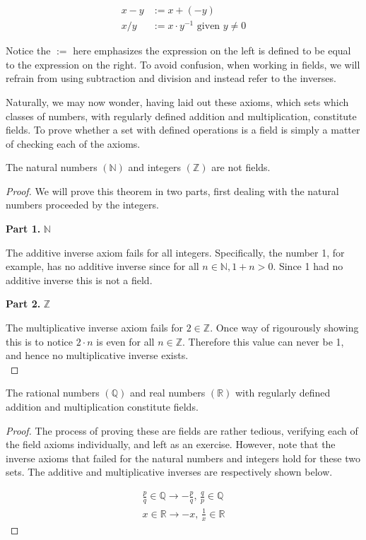 \documentclass[twoside]{report}
\newcommand{\header}[2]{\begin{flushright} \textbf{#1} #2 \end{flushright}}
\begin{document}
\begin{align}
	x - y &:= x + (-y) \\
	x / y &:= x \cdot y^{-1} \text{ given } y \neq 0
\end{align}

Notice the $:=$ here emphasizes the expression on the left is defined to be equal to the expression on the right. To avoid confusion, when working in fields, we will refrain from using subtraction and division and instead refer to the inverses.

Naturally, we may now wonder, having laid out these axioms, which sets which classes of numbers, with regularly defined addition and multiplication, constitute fields. To prove whether a set with defined operations is a field is simply a matter of checking each of the axioms. \\

\vspace{\baselineskip}
\begin{theorem}
	The natural numbers $(\mathbb{N})$ and integers $(\mathbb{Z})$ are not fields. 
\end{theorem}

\begin{proof} 
	We will prove this theorem in two parts, first dealing with the natural numbers proceeded by the integers.
	\header{Part 1. }{$\mathbb{N}$}
	The additive inverse axiom fails for all integers. Specifically, the number 1, for example, has no additive inverse since for all $n \in \mathbb{N}, 1 + n > 0$. Since 1 had no additive inverse this is not a field.
	
	\header{Part 2. }{$\mathbb{Z}$}
	The multiplicative inverse axiom fails for $2 \in \mathbb{Z}$. Once way of rigourously showing this is to notice $2 \cdot n$ is even for all $n \in \mathbb{Z}$. Therefore this value can never be 1, and hence no multiplicative inverse exists. \\
\end{proof}
\vspace{\baselineskip}

\vspace{\baselineskip}
\begin{theorem}
	The rational numbers $(\mathbb{Q})$ and real numbers $(\mathbb{R})$ with regularly defined addition and multiplication constitute fields.
\end{theorem}

\begin{proof}
	The process of proving these are fields are rather tedious, verifying each of the field axioms individually, and left as an exercise. However, note that the inverse axioms that failed for the natural numbers and integers hold for these two sets. The additive and multiplicative inverses are respectively shown below.
	
	\begin{align*}
		\frac{p}{q} \in \mathbb{Q} \rightarrow -\frac{p}{q}, \, \frac{q}{p} \in \mathbb{Q} \\
		x \in \mathbb{R} \rightarrow -x, \, \frac{1}{x} \in \mathbb{R}
	\end{align*}
\end{proof}
\vspace{\baselineskip}
\end{document}
